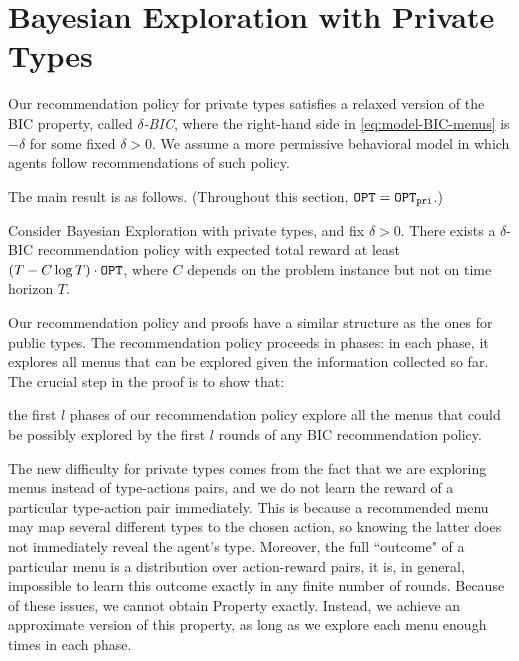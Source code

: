 
\section{Bayesian Exploration with Private Types}
\label{sec:private_nc}

Our recommendation policy for private types satisfies a relaxed version of the BIC property, called \emph{$\delta$-BIC}, where the right-hand side in \eqref{eq:model-BIC-menus} is $-\delta$ for some fixed $\delta>0$. We assume a more permissive behavioral model in which agents follow recommendations of such policy.

The main result is as follows. (Throughout this section, $\mathtt{OPT} = \mathtt{OPT}_{\mathtt{pri}}$.)


\begin{theorem}
\label{thm:private_nocc}
Consider Bayesian Exploration with private types, and fix $\delta > 0$. There exists a $\delta$-BIC recommendation policy with expected total reward at least $\left(T - C \log T \right) \cdot \mathtt{OPT}$, where $C$ depends on the problem instance but not on time horizon $T$.
\end{theorem}

Our recommendation policy and proofs have a similar structure as the ones for public types. The recommendation policy proceeds in phases: in each phase, it explores all menus that can be explored given the information collected so far. The crucial step in the proof is to show that: 

\begin{property}
\item the first $l$ phases of our recommendation policy explore all the menus that could be possibly explored by the first $l$ rounds of any BIC recommendation policy.
    \label{prop:private-exploration}
\end{property}

The new difficulty for private types comes from the fact that we are exploring menus instead of type-actions pairs, and we do not learn the reward of a particular type-action pair immediately. This is because a recommended menu may map several different types to the chosen action, so knowing the latter does not immediately reveal the agent's type. Moreover, the full ``outcome" of a particular menu is a distribution over action-reward pairs, it is, in general, impossible to learn this outcome exactly in any finite number of rounds.  Because of these issues, we cannot obtain Property  exactly. Instead, we achieve an approximate version of this property, as long as we explore each menu enough times in each phase. 

